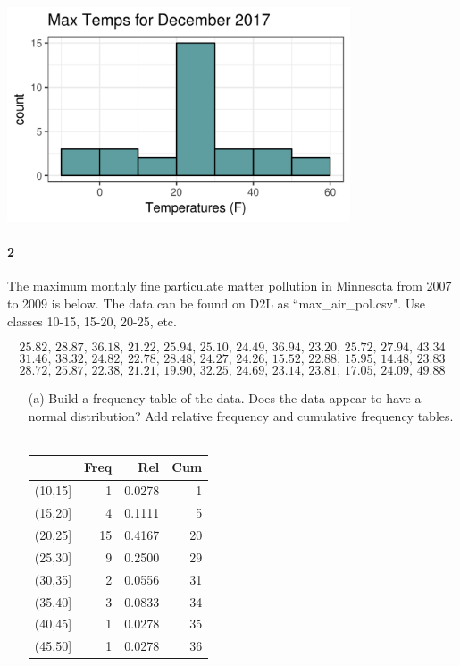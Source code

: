 \documentclass{article}
\begin{document}
\begin{flushleft}
\begin{itemize}
{\centering
\includegraphics[width=4in]{images/grp02_Q1_b}
\par}
\end{itemize}



\newpage
\paragraph{2} The maximum monthly fine particulate matter pollution in Minnesota from 2007 to 2009 is below. The data can be found on D2L as ``max\_air\_pol.csv". Use classes 10-15, 15-20, 20-25, etc. 

\[  25.82 ,\,  28.87 ,\, 36.18 ,\, 21.22 ,\, 25.94 ,\, 25.10 ,\, 24.49 ,\, 36.94 ,\, 23.20 ,\, 25.72 ,\, 27.94 ,\, 43.34 \] 
\[31.46 ,\, 38.32 ,\, 24.82 ,\, 22.78 ,\, 28.48 ,\, 24.27 ,\, 24.26 ,\, 15.52 ,\, 22.88 ,\, 15.95 ,\, 14.48 ,\, 23.83 \]
\[ 28.72 ,\, 25.87 ,\, 22.38 ,\, 21.21 ,\, 19.90 ,\, 32.25 ,\, 24.69 ,\, 23.14 ,\, 23.81 ,\, 17.05 ,\, 24.09 ,\, 49.88 \]
\begin{itemize}
\item [(a)] Build a frequency table of the data. Does the data appear to have a normal distribution? Add relative frequency and cumulative frequency tables.\\
\bigskip
{}\\
\bigskip

{\centering
\begin{tabular}{rrrr}
  \hline
 & Freq & Rel & Cum \\ 
  \hline
(10,15] & 1 & 0.0278 & 1 \\ 
  (15,20] & 4 & 0.1111 & 5 \\ 
  (20,25] & 15 & 0.4167 & 20 \\ 
  (25,30] & 9 & 0.2500 & 29 \\ 
  (30,35] & 2 & 0.0556 & 31 \\ 
  (35,40] & 3 & 0.0833 & 34 \\ 
  (40,45] & 1 & 0.0278 & 35 \\ 
  (45,50] & 1 & 0.0278 & 36 \\ 
   \hline
\end{tabular}
\par}



\end{itemize}
\end{flushleft}
\end{document}
